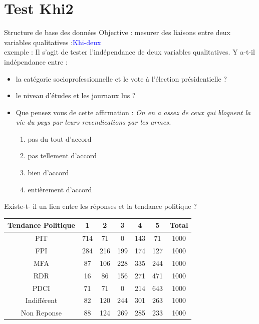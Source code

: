 \documentclass[12pt]{beamer}
\begin{document}
\section{Test Khi2}
\begin{frame}{Structure de base des données}
Objective : mesurer des liaisons entre deux variables qualitatives :\textcolor{blue}{Khi-deux}\\
exemple : 
Il s’agit de tester l’indépendance de deux variables qualitatives.
Y a-t-il indépendance entre :


\begin{itemize}
\item la catégorie socioprofessionnelle et le vote à l'élection
présidentielle ?
\item  le niveau d’études et les journaux lus ?

\item Que pensez vous de cette affirmation : \textit{On en a assez de ceux qui bloquent la vie du pays par leurs revendications par les armes.}

\begin{enumerate}
\item  pas du tout d'accord
\item pas tellement d'accord 
\item bien d'accord 
\item entièrement d'accord
\end{enumerate}
\end{itemize}

 
\end{frame}

\begin{frame}{}
\centering
Existe-t- il un lien entre les réponses et la tendance politique ?   
\begin{table}
\begin{tabular}{|c|c|c|c|c|c|c|}
\hline 
Tendance Politique & 1 & 2 & 3 & 4 & 5 & Total \\ 
\hline 
PIT & 714 & 71 & 0 & 143 & 71 & 1000 \\ 
\hline 
FPI & 284 & 216 & 199 & 174 & 127 & 1000 \\ 
\hline 
MFA & 87 & 106 & 228 & 335 & 244 & 1000 \\ 
\hline 
RDR & 16 & 86 & 156 & 271 & 471 & 1000 \\ 
\hline 
PDCI & 71 & 71 & 0 & 214 & 643 & 1000 \\ 
\hline 
Indifférent & 82 & 120 & 244 & 301 & 263 & 1000 \\ 
\hline 
Non Reponse & 88 & 124 & 269 & 285 & 233 & 1000 \\ 
\hline 
\end{tabular} 
\end{table}

 
\end{frame}
\end{document}
